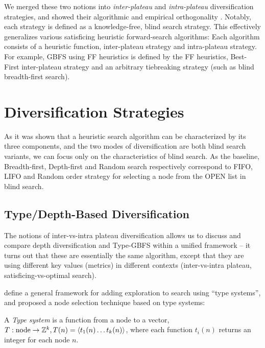 We merged these two notions into \emph{inter-plateau} and \emph{intra-plateau} diversification
strategies, and showed their algorithmic and empirical orthogonality \cite{Asai2017b}. Notably, each
strategy is defined as a knowledge-free, blind search strategy. This effectively generalizes various
satisficing heuristic forward-search algorithms: Each algorithm consists of a heuristic function,
inter-plateau strategy and intra-plateau strategy. For example, GBFS using FF heuristics is defined
by the FF heuristics, Best-First inter-plateau strategy and an arbitrary tiebreaking strategy (such
as blind breadth-first search).


\section{Diversification Strategies}

\label{sec:div}

As it was shown that a heuristic search algorithm can be characterized by its three components, and
the two modes of diversification are both blind search variants, we can focus only on the
characteristics of blind search.  As the baseline, Breadth-first, Depth-first and Random search
respectively correspond to FIFO, LIFO and Random order strategy for selecting a node from the OPEN
list in blind search.

\subsection{Type/Depth-Based Diversification}

The notions of inter-vs-intra plateau diversification allows us to discuss and compare depth
diversification \cite{Asai2016} and Type-GBFS \cite{xie14type} within a unified framework -- it
turns out that these are essentially the same algorithm, except that they are using different key
values (metrics) in different contexts (inter-vs-intra plateau, satisficing-vs-optimal search).

\cite{lelis2013stratified} define a general framework for
adding exploration to search using ``type systems'', and \cite{xie14type} proposed a node selection technique based on type systems:

\begin{defi} 
A \emph{Type system} \cite{lelis2013stratified} is a 
function from a node to a vector,
$T: \text{node} \rightarrow \mathbb{Z}^k, T(n)={\left<t_1(n) \ldots t_k(n)\right>} $, where each function $t_i(n)$ returns an integer for each node $n$.
\end{defi}

